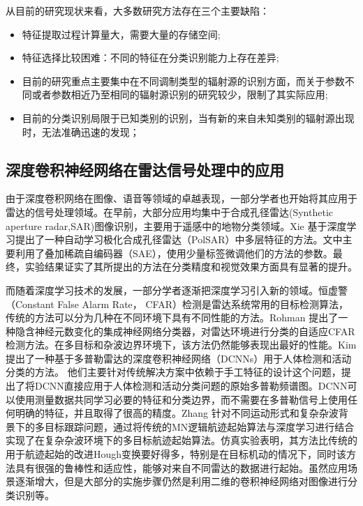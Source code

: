 从目前的研究现状来看，大多数研究方法存在三个主要缺陷：
\begin{itemize}
	\item 特征提取过程计算量大，需要大量的存储空间;
	\item 特征选择比较困难：不同的特征在分类识别能力上存在差异;
	\item 目前的研究重点主要集中在不同调制类型的辐射源的识别方面，而关于参数不同或者参数相近乃至相同的辐射源识别的研究较少，限制了其实际应用;
	\item 目前的分类识别局限于已知类别的识别，当有新的来自未知类别的辐射源出现时，无法准确迅速的发现；
\end{itemize}



\subsection{深度卷积神经网络在雷达信号处理中的应用}

由于深度卷积网络在图像、语音等领域的卓越表现，一部分学者也开始将其应用于雷达的信号处理领域。在早前，大部分应用均集中于合成孔径雷达(Synthetic aperture radar,SAR)图像识别，主要用于遥感中的地物分类领域\cite{chen2014sar,xie2014multilayer,lv2014classification}。Xie \cite{xie2014multilayer}基于深度学习提出了一种自动学习极化合成孔径雷达（PolSAR）中多层特征的方法。文中主要利用了叠加稀疏自编码器（SAE），使用少量标签微调他们的方法的参数。最终，实验结果证实了其所提出的方法在分类精度和视觉效果方面具有显著的提升。

而随着深度学习技术的发展，一部分学者逐渐把深度学习引入新的领域。恒虚警 （Constant False Alarm Rate， CFAR）检测是雷达系统常用的目标检测算法，传统的方法可以分为几种在不同环境下具有不同性能的方法。Rohman \cite{rohman2017classification}提出了一种隐含神经元数变化的集成神经网络分类器，对雷达环境进行分类的自适应CFAR检测方法。在多目标和杂波边界环境下，该方法仍然能够表现出最好的性能。Kim提出了一种基于多普勒雷达的深度卷积神经网络（DCNNs）用于人体检测和活动分类的方法\cite{kim2016human}。 他们主要针对传统解决方案中依赖于手工特征的设计这个问题，提出了将DCNN直接应用于人体检测和活动分类问题的原始多普勒频谱图。DCNN可以使用测量数据共同学习必要的特征和分类边界，而不需要在多普勒信号上使用任何明确的特征，并且取得了很高的精度。Zhang \cite{zhang2017novel}针对不同运动形式和复杂杂波背景下的多目标跟踪问题，通过将传统的MN逻辑航迹起始算法与深度学习进行结合实现了在复杂杂波环境下的多目标航迹起始算法。仿真实验表明，其方法比传统的用于航迹起始的改进Hough变换要好得多，特别是在目标机动的情况下，同时该方法具有很强的鲁棒性和适应性，能够对来自不同雷达的数据进行起始。虽然应用场景逐渐增大，但是大部分的实施步骤仍然是利用二维的卷积神经网络对图像进行分类识别等。

